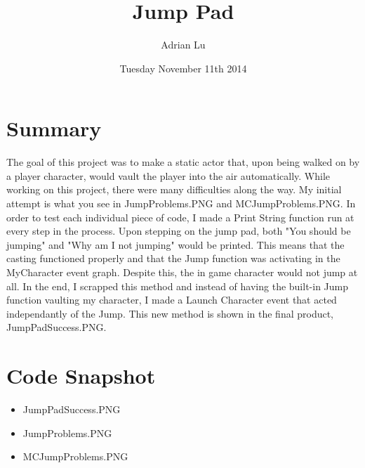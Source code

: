 \documentclass[a4paper]{article}
\title{Jump Pad}
\author{Adrian Lu}
\date{Tuesday November 11th 2014}
\begin{document}
\maketitle

\section{Summary}

The goal of this project was to make a static actor that, upon being walked on by a player character, would vault the player into the air automatically. While working on this project, there were many difficulties along the way. My initial attempt is what you see in JumpProblems.PNG and MCJumpProblems.PNG. In order to test each individual piece of code, I made a Print String function run at every step in the process. Upon stepping on the jump pad, both "You should be jumping" and "Why am I not jumping" would be printed. This means that the casting functioned properly and that the Jump function was activating in the MyCharacter event graph. Despite this, the in game character would not jump at all. In the end, I scrapped this method and instead of having the built-in Jump function vaulting my character, I made a Launch Character event that acted independantly of the Jump. This new method is shown in the final product, JumpPadSuccess.PNG.

\section{Code Snapshot}

\begin{itemize}
\item JumpPadSuccess.PNG
\item JumpProblems.PNG
\item MCJumpProblems.PNG
\end{itemize}
\end{document}
